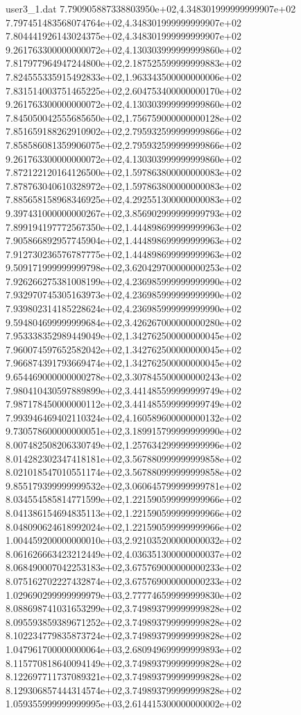\begin{filecontents}{user3_1.dat}
7.790905887338803950e+02,4.348301999999999907e+02
7.797451483568074764e+02,4.348301999999999907e+02
7.804441926143024375e+02,4.348301999999999907e+02
9.261763300000000072e+02,4.130303999999999860e+02
7.817977964947244800e+02,2.187525599999999883e+02
7.824555335915492833e+02,1.963343500000000006e+02
7.831514003751465225e+02,2.604753400000000170e+02
9.261763300000000072e+02,4.130303999999999860e+02
7.845050042555685650e+02,1.756759000000000128e+02
7.851659188262910902e+02,2.795932599999999866e+02
7.858586081359906075e+02,2.795932599999999866e+02
9.261763300000000072e+02,4.130303999999999860e+02
7.872122120164126500e+02,1.597863800000000083e+02
7.878763040610328972e+02,1.597863800000000083e+02
7.885658158968346925e+02,4.292551300000000083e+02
9.397431000000000267e+02,3.856902999999999793e+02
7.899194197772567350e+02,1.444898699999999963e+02
7.905866892957745904e+02,1.444898699999999963e+02
7.912730236576787775e+02,1.444898699999999963e+02
9.509171999999999798e+02,3.620429700000000253e+02
7.926266275381008199e+02,4.236985999999999990e+02
7.932970745305163973e+02,4.236985999999999990e+02
7.939802314185228624e+02,4.236985999999999990e+02
9.594804699999999684e+02,3.426267000000000280e+02
7.953338352989449049e+02,1.342762500000000045e+02
7.960074597652582042e+02,1.342762500000000045e+02
7.966874391793669474e+02,1.342762500000000045e+02
9.654469000000000278e+02,3.307845500000000243e+02
7.980410430597889899e+02,3.441485599999999749e+02
7.987178450000000112e+02,3.441485599999999749e+02
7.993946469402110324e+02,4.160589600000000132e+02
9.730578600000000051e+02,3.189915799999999990e+02
8.007482508206330749e+02,1.257634299999999996e+02
8.014282302347418181e+02,3.567880999999999858e+02
8.021018547010551174e+02,3.567880999999999858e+02
9.855179399999999532e+02,3.060645799999999781e+02
8.034554585814771599e+02,1.221590599999999966e+02
8.041386154694835113e+02,1.221590599999999966e+02
8.048090624618992024e+02,1.221590599999999966e+02
1.004459200000000010e+03,2.921035200000000032e+02
8.061626663423212449e+02,4.036351300000000037e+02
8.068490007042253183e+02,3.675769000000000233e+02
8.075162702227432874e+02,3.675769000000000233e+02
1.029690299999999979e+03,2.777746599999999830e+02
8.088698741031653299e+02,3.749893799999999828e+02
8.095593859389671252e+02,3.749893799999999828e+02
8.102234779835873724e+02,3.749893799999999828e+02
1.047961700000000064e+03,2.680949699999999893e+02
8.115770818640094149e+02,3.749893799999999828e+02
8.122697711737089321e+02,3.749893799999999828e+02
8.129306857444314574e+02,3.749893799999999828e+02
1.059355999999999995e+03,2.614415300000000002e+02

\end{filecontents}
